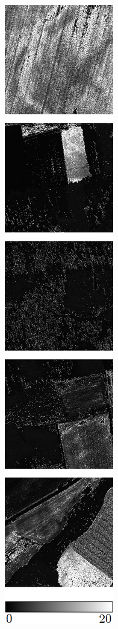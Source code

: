 \begin{figure}
\begin{subfigure}{\VegetationImageWidth}
        \caption{}
        \label{fig:svi_evi}
    \end{subfigure} \hspace{2mm}
    \begin{subfigure}{\VegetationImageWidth}
        \includegraphics[width=\textwidth]{images/vegetation/savi}

\end{subfigure}
\end{figure}
